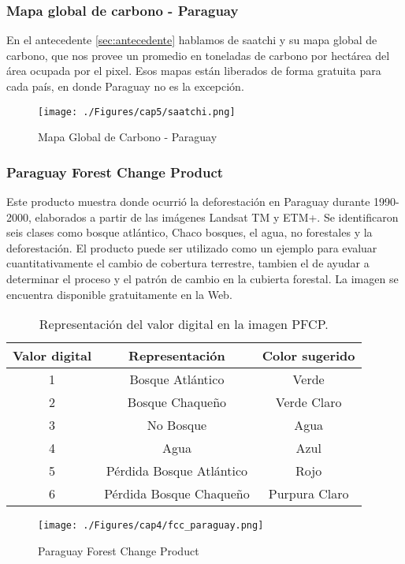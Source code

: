\subsubsection{Mapa global de carbono - Paraguay}\label{sec:saatchiMapa}
En el antecedente \ref{sec:antecedente} hablamos de saatchi y su mapa global de carbono, que nos provee un promedio en toneladas de carbono por hect\'area del \'area ocupada por el pixel. Esos mapas están liberados de forma gratuita para cada pa\'is, en donde Paraguay no es la excepción.
\begin{figure}[H]
	\centering
	\texttt{[image: ./Figures/cap5/saatchi.png]}
	\caption{Mapa Global de Carbono - Paraguay}
	\label{fig:saatchi}
\end{figure}


\subsubsection{Paraguay Forest Change Product}\label{sec:fcc}
Este producto muestra donde ocurri\'o la deforestaci\'on en Paraguay durante 1990-2000, elaborados a partir de las im\'agenes Landsat TM y ETM+. Se identificaron seis clases como bosque atl\'antico, Chaco bosques, el agua, no forestales y la deforestaci\'on. El producto puede ser utilizado como un ejemplo para evaluar cuantitativamente el cambio de cobertura terrestre, tambien el de ayudar a determinar el proceso y el patr\'on de cambio en la cubierta forestal. La imagen se encuentra disponible gratuitamente en la Web\cite{gl2015Uni}.
\begin{table}[htbp]\centering
\begin{tabular}{|c|c|c|}
	\hline \textbf{Valor digital} &\textbf{ Representaci\'on} & \textbf{Color sugerido} \\ 
	\hline 1 & Bosque Atl\'antico & Verde \\ 
	\hline 2 & Bosque Chaque\~{n}o & Verde Claro \\ 
	\hline 3 & No Bosque & Agua \\ 
	\hline 4 & Agua & Azul \\ 
	\hline 5 & P\'erdida Bosque Atl\'antico & Rojo \\ 
	\hline 6 & P\'erdida Bosque Chaque\~{n}o & Purpura Claro \\ 
	\hline 
\end{tabular} 
\caption{Representaci\'on del valor digital en la imagen PFCP.}
\end{table}

\begin{figure}[H]
	\centering
	\texttt{[image: ./Figures/cap4/fcc\_paraguay.png]}
	\caption{Paraguay Forest Change Product}
	\label{fig:fcc}
\end{figure}




